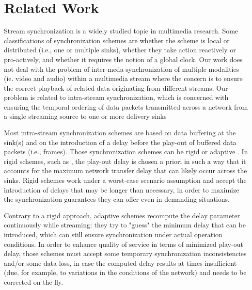 \documentclass{sig-alternate}
\begin{document}
\section{Related Work} \label{related}

Stream synchronization is a widely studied topic in multimedia
research.  Some classifications of synchronization schemes are whether
the scheme is local or distributed (i.e., one or multiple sinks),
whether they take action reactively or pro-actively, and whether it
requires the notion of a global clock.  Our work does not deal with
the problem of inter-meda synchronization of multiple modalities
(ie. video and audio) within a multimedia stream where the concern is
to ensure the correct playback of related data originating from
different streams.  Our problem is related to intra-stream
synchronization, which is concerned with ensuring the temporal
ordering of data packets transmitted across a network from a single
streaming source to one or more delivery sinks

Most intra-stream synchronization schemes are based on data buffering
at the sink(s) and on the introduction of a delay before the play-out
of buffered data packets (i.e., frames).  Those synchronization
schemes can be rigid or adaptive \cite{Clark92}.  In rigid schemes,
such as \cite{Ferrari}, the play-out delay is chosen a priori in such
a way that it accounts for the maximum network transfer delay that can
likely occur across the sinks.  Rigid schemes work under a worst-case
scenario assumption and accept the introduction of delays that may be
longer than necessary, in order to maximize the synchronization
guarantees they can offer even in demanding situations.  

Contrary to a rigid approach, adaptive schemes \cite{ASP,Lancaster,FSP} 
recompute the delay parameter continuously while streaming: they
try to "guess" the minimum delay that can be introduced, which can
still ensure synchronization under actual operation conditions.  In
order to enhance quality of service in terms of minimized play-out
delay, those schemes must accept some temporary synchronization
inconsistencies and/or some data loss, in case the computed delay
results at times insufficient (due, for example, to variations in the
conditions of the network) and needs to be corrected on the fly.
\end{document}
